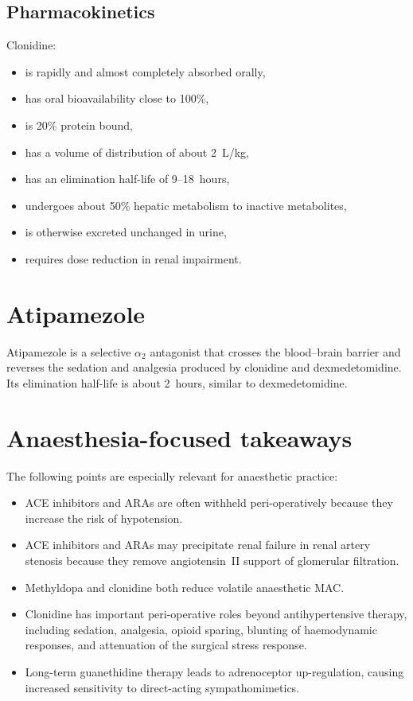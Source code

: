 \documentclass[11pt,a4paper]{article}
\begin{document}
\subsection{Pharmacokinetics}

Clonidine:
\begin{itemize}
    \item is rapidly and almost completely absorbed orally,
    \item has oral bioavailability close to 100\%,
    \item is 20\% protein bound,
    \item has a volume of distribution of about 2~L/kg,
    \item has an elimination half-life of 9--18~hours,
    \item undergoes about 50\% hepatic metabolism to inactive metabolites,
    \item is otherwise excreted unchanged in urine,
    \item requires dose reduction in renal impairment.
\end{itemize}

\section{Atipamezole}

Atipamezole is a selective $\alpha_2$ antagonist that crosses the blood--brain barrier and reverses the sedation and analgesia produced by clonidine and dexmedetomidine. Its elimination half-life is about 2~hours, similar to dexmedetomidine.

\section{Anaesthesia-focused takeaways}

The following points are especially relevant for anaesthetic practice:
\begin{itemize}
    \item ACE inhibitors and ARAs are often withheld peri-operatively because they increase the risk of hypotension.
    \item ACE inhibitors and ARAs may precipitate renal failure in renal artery stenosis because they remove angiotensin~II support of glomerular filtration.
    \item Methyldopa and clonidine both reduce volatile anaesthetic MAC.
    \item Clonidine has important peri-operative roles beyond antihypertensive therapy, including sedation, analgesia, opioid sparing, blunting of haemodynamic responses, and attenuation of the surgical stress response.
    \item Long-term guanethidine therapy leads to adrenoceptor up-regulation, causing increased sensitivity to direct-acting sympathomimetics.
\end{itemize}
\end{document}
